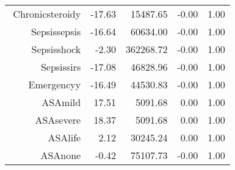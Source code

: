 \begin{tabular}{rrrrr}
$$  Chronic\-steroid\-y & -17.63 & 15487.65 & -0.00 & 1.00 \\ 
  Sepsis\-sepsis & -16.64 & 60634.00 & -0.00 & 1.00 \\ 
  Sepsis\-shock & -2.30 & 362268.72 & -0.00 & 1.00 \\ 
  Sepsis\-sirs & -17.08 & 46828.96 & -0.00 & 1.00 \\ 
  Emergency\-y & -16.49 & 44530.83 & -0.00 & 1.00 \\ 
  ASA\-mild & 17.51 & 5091.68 & 0.00 & 1.00 \\ 
  ASA\-severe & 18.37 & 5091.68 & 0.00 & 1.00 \\ 
  ASA\-life & 2.12 & 30245.24 & 0.00 & 1.00 \\ 
  ASA\-none & -0.42 & 75107.73 & -0.00 & 1.00 \\ 
   \hline
\end{tabular}

